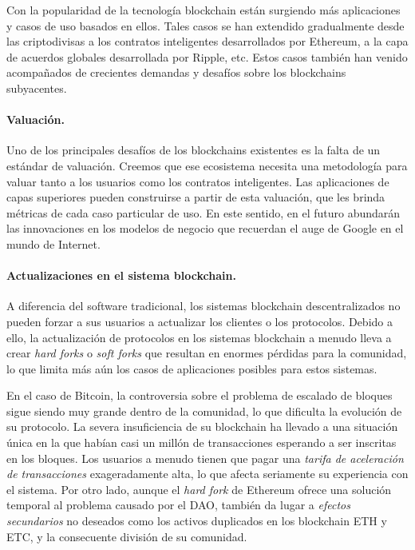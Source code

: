 Con la popularidad de la tecnología blockchain están surgiendo más aplicaciones y casos de uso basados en ellos.  Tales casos se han extendido gradualmente desde las criptodivisas a los contratos inteligentes desarrollados por Ethereum, a la capa de acuerdos globales desarrollada por Ripple, etc. Estos casos también han venido acompañados de crecientes demandas y desafíos sobre los blockchains subyacentes.

\paragraph{Valuación.} Uno de los principales desafíos de los blockchains existentes es la falta de un estándar de valuación. Creemos que ese ecosistema necesita una metodología para valuar tanto a los usuarios como los contratos inteligentes. Las aplicaciones de capas superiores pueden construirse a partir de esta valuación, que les brinda métricas de cada caso particular de uso. En este sentido, en el futuro abundarán las innovaciones en los modelos de negocio que recuerdan el auge de Google en el mundo de Internet.

\paragraph{Actualizaciones en el sistema blockchain.} A diferencia del software tradicional, los sistemas blockchain descentralizados no pueden forzar a sus usuarios a actualizar los clientes o los protocolos. Debido a ello, la actualización de protocolos en los sistemas blockchain a menudo lleva a crear \textit{hard forks} o \textit{soft forks} que resultan en enormes pérdidas para la comunidad, lo que limita más aún los casos de aplicaciones posibles para estos sistemas.

En el caso de Bitcoin, la controversia sobre el problema de escalado de bloques sigue siendo muy grande dentro de la comunidad, lo que dificulta la evolución de su protocolo. La severa insuficiencia de su blockchain ha llevado a una situación única en la que habían casi un millón de transacciones esperando a ser inscritas en los bloques. Los usuarios a menudo tienen que pagar una \textit{tarifa de aceleración de transacciones} exageradamente alta, lo que afecta seriamente su experiencia con el sistema. Por otro lado, aunque el \textit{hard fork} de Ethereum ofrece una solución temporal al problema causado por el DAO, también da lugar a \textit{efectos secundarios} no deseados como los activos duplicados en los blockchain ETH y ETC, y la consecuente división de su comunidad.

